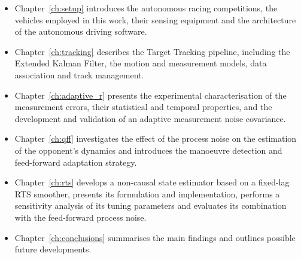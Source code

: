 \begin{itemize}
\item Chapter~\ref{ch:setup} introduces the autonomous racing competitions, the vehicles employed in this work, their sensing equipment and the architecture of the autonomous driving software.

\item Chapter~\ref{ch:tracking} describes the Target Tracking pipeline, including the Extended Kalman Filter, the motion and measurement models, data association and track management.

\item Chapter~\ref{ch:adaptive_r} presents the experimental characterisation of the measurement errors, their statistical and temporal properties, and the development and validation of an adaptive measurement noise covariance.

\item Chapter~\ref{ch:qff} investigates the effect of the process noise on the estimation of the opponent's dynamics and introduces the manoeuvre detection and feed-forward adaptation strategy.

\item Chapter~\ref{ch:rts} develops a non-causal state estimator based on a fixed-lag RTS smoother, presents its formulation and implementation, performs a sensitivity analysis of its tuning parameters and evaluates its combination with the feed-forward process noise.

\item Chapter~\ref{ch:conclusions} summarises the main findings and outlines possible future developments.
\end{itemize}
